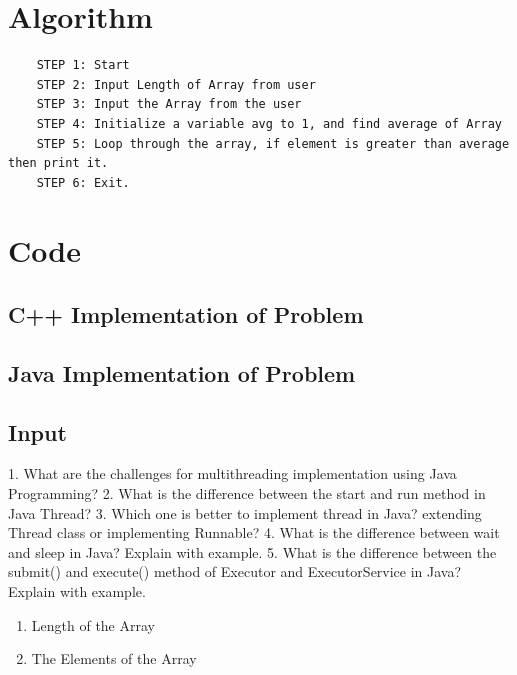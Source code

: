 \documentclass[11pt]{article}
\begin{document}
\section{Algorithm}
\begin{verbatim}
	STEP 1: Start
	STEP 2: Input Length of Array from user
	STEP 3: Input the Array from the user
	STEP 4: Initialize a variable avg to 1, and find average of Array
	STEP 5: Loop through the array, if element is greater than average then print it. 
	STEP 6: Exit. 
\end{verbatim}

\section{Code}
\subsection{C++ Implementation of Problem}


\subsection{Java Implementation of Problem}



\subsection{Input}1. What are the challenges for multithreading implementation using Java
Programming?
2. What is the difference between the start and run method in Java Thread?
3. Which one is better to implement thread in Java? extending Thread class or
implementing Runnable?
4. What is the difference between wait and sleep in Java? Explain with
example.
5. What is the difference between the submit() and execute() method of
Executor and ExecutorService in Java? Explain with example.
\begin{enumerate}
	\item Length of the Array
	\item The Elements of the Array
\end{enumerate}
\end{document}
